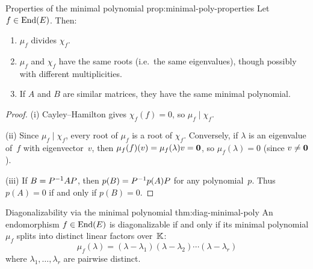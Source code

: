 \begin{proposition}{Properties of the minimal polynomial}%
{prop:minimal-poly-properties}
Let $f\in\operatorname{End}(E)$.  Then:
\begin{enumerate}[label=(\roman*)]
  \item $\mu_f$ divides $\chi_f$.
  \item $\mu_f$ and $\chi_f$ have the same roots (i.e.\ the same
    eigenvalues), though possibly with different multiplicities.
  \item If $A$ and $B$ are similar matrices, they have the same
    minimal polynomial.
\end{enumerate}
\end{proposition}

\begin{proof}
(i) Cayley--Hamilton gives $\chi_f(f) = 0$, so $\mu_f \mid \chi_f$.

(ii) Since $\mu_f \mid \chi_f$, every root of $\mu_f$ is a root of
$\chi_f$.  Conversely, if $\lambda$ is an eigenvalue of~$f$ with
eigenvector~$v$, then $\mu_f(f)(v) = \mu_f(\lambda)v = \mathbf{0}$,
so $\mu_f(\lambda) = 0$ (since $v \neq \mathbf{0}$).

(iii) If $B = {P}^{-1}AP$, then $p(B) = {P}^{-1}p(A)P$ for any
polynomial~$p$.  Thus $p(A) = 0$ if and only if $p(B) = 0$.
\end{proof}

\begin{theorem}{Diagonalizability via the minimal polynomial}%
{thm:diag-minimal-poly}
An endomorphism $f\in\operatorname{End}(E)$ is diagonalizable if and only if its
minimal polynomial $\mu_f$ splits into distinct linear factors
over~${\mathbb{K}}$:
\[
  \mu_f(\lambda) = (\lambda - \lambda_1)(\lambda - \lambda_2)\cdots
    (\lambda - \lambda_r)
\]
where $\lambda_1,\ldots,\lambda_r$ are pairwise distinct.
\end{theorem}

